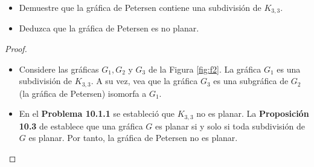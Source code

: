 \documentclass[12pt]{article}
\newenvironment{problem}[2][Problema]{\begin{trivlist}
\item[\hskip \labelsep {\bfseries #1}\hskip \labelsep {\bfseries #2.}]}{\end{trivlist}}
\begin{document}
\newpage
\begin{problem}{10.1.3}\text{}
\begin{itemize}
    \item[a)] Demuestre que la gráfica de Petersen contiene una subdivisión de $K_{3,3}.$
    \item[b)] Deduzca que la gráfica de Petersen es no planar. 
\end{itemize}
\end{problem}
\begin{proof} \text{}
\begin{itemize}
    \item[a)] Considere las gráficas $G_1, G_2$ y $G_3$ de la Figura \ref{fig:f2}. La gráfica $G_1$ es una subdivisión de $K_{3,3}$. A su vez, vea que la gráfica $G_3$ es una subgráfica de $G_2$ (la gráfica de Petersen) isomorfa a $G_1.$ 
    \item[b)]  En el \textbf{Problema 10.1.1} se estableció que $K_{3,3}$ no es planar. La \textbf{Proposición 10.3} de \cite{10.5555/1481153} establece que una gráfica $G$ es planar si y solo si toda subdivisión de $G$ es planar. Por tanto, la gráfica de Petersen no es planar.
\end{itemize}
\end{proof}
\end{document}
